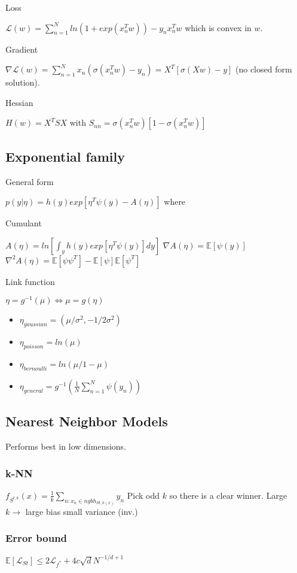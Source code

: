 Loss

$\mathcal{L}(w) = \sum_{n=1}^N ln(1 + exp(x_n^T w)) - y_n x_n^T w$ which is convex in $w$.

Gradient

$\nabla \mathcal{L}(w) = \sum_{n=1}^N x_n (\sigma(x_n^T w) - y_n) = X^T[\sigma(Xw) - y]$ (no closed form solution).

Hessian

$H(w) = X^T S X$ with $S_{nn} = \sigma(x_n^T w)[1-\sigma(x_n^T w)]$

\subsection{Exponential family}
General form

$p(y|\eta) = h(y) exp[\eta^T \psi(y) - A(\eta)]$ where

Cumulant
 
$A(\eta) = ln[\int_y h(y) exp[\eta^T \psi(y)] dy]$
\newline
$\nabla A(\eta) = \mathbb{E}[\psi(y)]$
\newline
$\nabla^2 A(\eta) = \mathbb{E}[\psi\psi^T] - \mathbb{E}[\psi]\mathbb{E}[\psi^T]$

Link function

$\eta = g^{-1}(\mu) \Leftrightarrow \mu = g(\eta)$

\begin{itemize}
\item $\eta_{gaussian} = (\mu / \sigma^2, - 1 / 2 \sigma^2)$
\item $\eta_{poisson} = ln(\mu)$	
\item $\eta_{bernoulli} = ln(\mu / 1 - \mu)$
\item $\eta_{general} = g^{-1}(\frac{1}{N} \sum_{n=1}^N \psi(y_n))$
\end{itemize}

\subsection{Nearest Neighbor Models}
Performs best in low dimensions. 
\subsubsection{k-NN}
$f_{S^{t,k}}(x) = \frac{1}{k} \sum_{n:x_n\in ngbh_{S{t,k}(x)}} y_n$
Pick odd $k$ so there is a clear winner.
Large $k \rightarrow$ large bias small variance (inv.)

\subsubsection{Error bound}
$\mathbb{E}[\mathcal{L}_{St}] \le 2 \mathcal{L}_{f^*} + 4 c \sqrt{d} N^{-1/d+1}$

